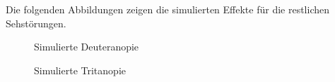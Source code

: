 \documentclass[a4paper]{article}
\begin{document}
\newpage

Die folgenden Abbildungen zeigen die simulierten Effekte für die restlichen Sehstörungen.

\begin{figure}[H]
\centering
{}
\caption{Simulierte Deuteranopie}
\end{figure}

\begin{figure}[H]
\centering
{}
\caption{Simulierte Tritanopie}
\end{figure}
\end{document}
